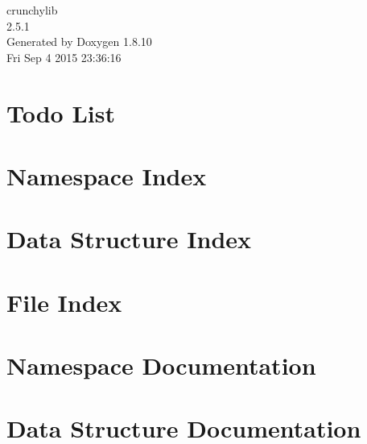 \documentclass[twoside]{book}
\newcommand{\+}{\discretionary{\mbox{\scriptsize$\hookleftarrow$}}{}{}}
\newcommand{\clearemptydoublepage}{%
  \newpage{\pagestyle{empty}\cleardoublepage}%
}
\begin{document}
\hypersetup{pageanchor=false,
             bookmarks=true,
             bookmarksnumbered=true,
             pdfencoding=unicode
            }
\begin{titlepage}
\vspace*{7cm}
\begin{center}%
{\Large crunchylib \\[1ex]\large 2.\+5.\+1 }\\
\vspace*{1cm}
{\large Generated by Doxygen 1.8.10}\\
\vspace*{0.5cm}
{\small Fri Sep 4 2015 23:36:16}\\
\end{center}
\end{titlepage}
\clearemptydoublepage
\tableofcontents
\clearemptydoublepage
{}
\hypersetup{pageanchor=true}

\chapter{Todo List}
\label{todo}
\hypertarget{todo}{}

\chapter{Namespace Index}

\chapter{Data Structure Index}

\chapter{File Index}

\chapter{Namespace Documentation}







\chapter{Data Structure Documentation}



















\end{document}
